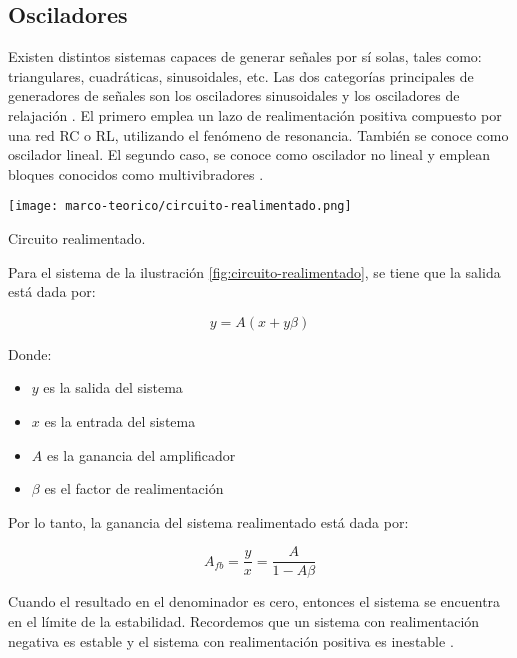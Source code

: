 \subsection{Osciladores}

Existen distintos sistemas capaces de generar señales por sí solas, tales como:
triangulares, cuadráticas, sinusoidales, etc. Las dos categorías principales de generadores de señales son los osciladores sinusoidales y los osciladores de relajación \cite{herrera-osciladores}. El primero emplea un lazo de realimentación positiva compuesto por una red RC o RL, utilizando el fenómeno de resonancia. También se conoce como oscilador lineal. El segundo caso, se conoce como oscilador no lineal y emplean bloques conocidos como multivibradores \cite{herrera-osciladores}.

\begin{ilustracion}[ht]
  \centering
  \texttt{[image: marco-teorico/circuito-realimentado.png]}
  \caption{Circuito realimentado.}
  \label{fig:circuito-realimentado}
\end{ilustracion}

Para el sistema de la ilustración \ref{fig:circuito-realimentado}, se tiene que la salida está dada por:

\begin{equation}
  y = A(x + y\beta)
\end{equation}

Donde:
\begin{itemize}
  \item $y$ es la salida del sistema
  \item $x$ es la entrada del sistema 
  \item $A$ es la ganancia del amplificador
  \item $\beta$ es el factor de realimentación
\end{itemize}

Por lo tanto, la ganancia del sistema realimentado está dada por:

\begin{equation}
  A_{fb} =\frac{y}{x} = \frac{A}{1-A\beta}
  \label{eq:ganancia-realimentacion}
\end{equation}

Cuando el resultado en el denominador es cero, entonces el sistema se encuentra en el límite de la estabilidad. Recordemos que un sistema con realimentación negativa es estable y el sistema con realimentación positiva es inestable \cite{herrera-osciladores}.

